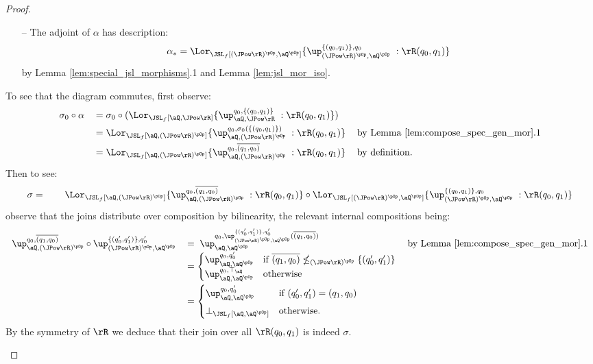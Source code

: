 \documentclass{article}
\begin{document}
\begin{proof}
\begin{itemize}
\begin{enumerate}[1.]
  \item[--]
  The adjoint of $\alpha$ has description:
  \[
  \alpha_* = \Lor_{\JSL_f[(\JPow \rR)^{\pOp}, \aQ^{\pOp} ]} \{ \up_{(\JPow \rR)^{\pOp},\aQ^{\pOp}}^{\{(q_0,q_1)\},q_0} \; : \rR(q_0,q_1)  \}
  \]
  by Lemma \ref{lem:special_jsl_morphisms}.1 and Lemma \ref{lem:jsl_mor_iso}.
  
\end{enumerate}
  
To see that the diagram commutes, first observe:
  \[
  \begin{tabular}{lll}
  $\sigma_0 \circ \alpha$
  &
  $= \sigma_0 \circ (\Lor_{\JSL_f[\aQ, \JPow \rR]} \{ \up_{\aQ,\JPow \rR}^{q_0,\{(q_0,q_1)\}} \; : \rR(q_0,q_1) \} )$
  \\[1ex]&
  $= \Lor_{\JSL_f[\aQ, (\JPow \rR)^{\pOp}]} \{ \up_{\aQ,(\JPow \rR)^{\pOp}}^{q_0,\sigma_0(\{(q_0,q_1)\})} \; : \rR(q_0,q_1)  \}$
  & by Lemma \ref{lem:compose_spec_gen_mor}.1
  \\[1ex]&
  $= \Lor_{\JSL_f[\aQ, (\JPow \rR)^{\pOp}]} \{ \up_{\aQ,(\JPow \rR)^{\pOp}}^{q_0,\overline{(q_1,q_0)}} \; : \rR(q_0,q_1)  \}$
  & by definition.
  \end{tabular}
  \]
  Then to see:
  \[
  \sigma = \qquad
  \Lor_{\JSL_f[\aQ, (\JPow \rR)^{\pOp}]} \{ \up_{\aQ,(\JPow \rR)^{\pOp}}^{q_0,\overline{(q_1,q_0)}} \; : \rR(q_0,q_1)  \}
  \circ
  \Lor_{\JSL_f[(\JPow \rR)^{\pOp}, \aQ^{\pOp} ]} \{ \up_{(\JPow \rR)^{\pOp},\aQ^{\pOp}}^{\{(q_0,q_1)\},q_0} \; : \rR(q_0,q_1)  \}
  \]
  observe that the joins distribute over composition by bilinearity, the relevant internal compositions being:
  \[
  \begin{tabular}{lll}
  $\up_{\aQ,(\JPow \rR)^{\pOp}}^{q_0,\overline{(q_1,q_0)}} \circ \up_{(\JPow \rR)^{\pOp},\aQ^{\pOp}}^{\{(q'_0,q'_1)\},q'_0}$
  &
  $= \; \up_{\aQ,\aQ^{\pOp}}^{q_0,\up_{(\JPow \rR)^{\pOp},\aQ^{\pOp}}^{\{(q'_0,q'_1)\},q'_0}(\overline{(q_1,q_0)})}$
  & by Lemma \ref{lem:compose_spec_gen_mor}.1
  \\&
  $=
  \begin{cases}
  \up_{\aQ,\aQ^{\pOp}}^{q_0,q'_0}
  & \text{if $\overline{(q_1,q_0)} \nleq_{(\JPow \rR)^{\pOp}} \{(q'_0,q'_1) \} $}
  \\
  \up_{\aQ,\aQ^{\pOp}}^{q_0,\top_\aQ}
  & \text{otherwise}
  \end{cases}$
  \\[3ex]&
  $=
  \begin{cases}
  \up_{\aQ,\aQ^{\pOp}}^{q_0,q'_0}
  & \text{if $(q'_0,q'_1) = (q_1,q_0)$}
  \\[1ex]
  \bot_{\JSL_f[\aQ,\aQ^{\pOp}]}
  & \text{otherwise}.
  \end{cases}$
  \end{tabular}
  \]
  By the symmetry of $\rR$ we deduce that their join over all $\rR(q_0,q_1)$ is indeed $\sigma$.
  

\end{itemize}
\end{proof}
\end{document}
